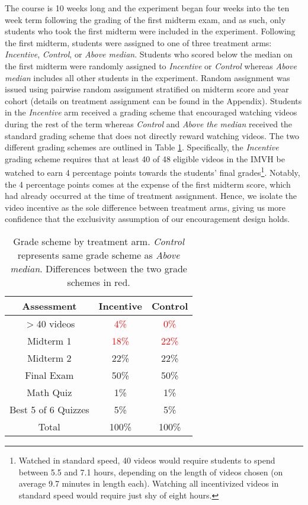 \documentclass[12pt]{article}
\newcommand{\red}[1]{\textcolor{red}{#1}}
\begin{document}
The course is 10 weeks long and the experiment began four weeks into the ten week term following the grading of the first midterm exam, and as such, only students who took the first midterm were included in the experiment. Following the first midterm, students were assigned to one of three treatment arms: \textit{Incentive}, \textit{Control}, or \textit{Above median}. Students who scored below the median on the first midterm were randomly assigned to \textit{Incentive} or \textit{Control} whereas \textit{Above median} includes all other students in the experiment. Random assignment was issued using pairwise random assignment stratified on midterm score and year cohort (details on treatment assignment can be found in the Appendix). Students in the \textit{Incentive} arm received a grading scheme that encouraged watching videos during the rest of the term whereas \textit{Control} and \textit{Above the median} received the standard grading scheme that does not directly reward watching videos. The two different grading schemes are outlined in Table \ref{gradescheme}. Specifically, the \textit{Incentive} grading scheme requires that at least 40 of 48 eligible videos in the IMVH be watched to earn 4 percentage points towards the students' final grades\footnote{Watched in standard speed, 40 videos would require students to spend between 5.5 and 7.1 hours, depending on the length of videos chosen (on average 9.7 minutes in length each). Watching all incentivized videos in standard speed would require just shy of eight hours.}.
Notably, the 4 percentage points comes at the expense of the first midterm score, which had already occurred at the time of treatment assignment. Hence, we isolate the video incentive as the sole difference between treatment arms, giving us more confidence that the exclusivity assumption of our encouragement design holds. %

\begin{table}
	\caption{Grade scheme by treatment arm. \textit{Control} represents same grade scheme as \textit{Above median}. Differences between the two grade schemes in red.}
	\centering
	\begin{tabular}{ c|c|c }
		Assessment & Incentive & Control \\
		\hline
		$>$40 videos & \red{4\%} & \red{0\%} \\
		Midterm 1 & \red{18\%} & \red{22\%} \\
		Midterm 2 & 22\% & 22\% \\
		Final Exam & 50\% & 50\% \\
		Math Quiz & 1\% & 1\% \\
		Best 5 of 6 Quizzes & 5\% & 5\% \\
		\hline
		Total & 100\% & 100\% \\
	\end{tabular}
	\label{gradescheme}
\end{table}
\end{document}
